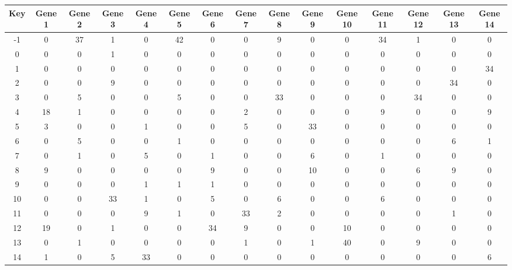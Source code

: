 \begin{tabular}{|c|c|c|c|c|c|c|c|c|c|c|c|c|c|c|}
\hline
Key & Gene 1 & Gene 2 & Gene 3 & Gene 4 & Gene 5 & Gene 6 & Gene 7 & Gene 8 & Gene 9 & Gene 10 & Gene 11 & Gene 12 & Gene 13 & Gene 14 \\
\hline
-1 & 0 & 37 & 1 & 0 & 42 & 0 & 0 & 9 & 0 & 0 & 34 & 1 & 0 & 0 \\
0 & 0 & 0 & 1 & 0 & 0 & 0 & 0 & 0 & 0 & 0 & 0 & 0 & 0 & 0 \\
1 & 0 & 0 & 0 & 0 & 0 & 0 & 0 & 0 & 0 & 0 & 0 & 0 & 0 & 34 \\
2 & 0 & 0 & 9 & 0 & 0 & 0 & 0 & 0 & 0 & 0 & 0 & 0 & 34 & 0 \\
3 & 0 & 5 & 0 & 0 & 5 & 0 & 0 & 33 & 0 & 0 & 0 & 34 & 0 & 0 \\
4 & 18 & 1 & 0 & 0 & 0 & 0 & 2 & 0 & 0 & 0 & 9 & 0 & 0 & 9 \\
5 & 3 & 0 & 0 & 1 & 0 & 0 & 5 & 0 & 33 & 0 & 0 & 0 & 0 & 0 \\
6 & 0 & 5 & 0 & 0 & 1 & 0 & 0 & 0 & 0 & 0 & 0 & 0 & 6 & 1 \\
7 & 0 & 1 & 0 & 5 & 0 & 1 & 0 & 0 & 6 & 0 & 1 & 0 & 0 & 0 \\
8 & 9 & 0 & 0 & 0 & 0 & 9 & 0 & 0 & 10 & 0 & 0 & 6 & 9 & 0 \\
9 & 0 & 0 & 0 & 1 & 1 & 1 & 0 & 0 & 0 & 0 & 0 & 0 & 0 & 0 \\
10 & 0 & 0 & 33 & 1 & 0 & 5 & 0 & 6 & 0 & 0 & 6 & 0 & 0 & 0 \\
11 & 0 & 0 & 0 & 9 & 1 & 0 & 33 & 2 & 0 & 0 & 0 & 0 & 1 & 0 \\
12 & 19 & 0 & 1 & 0 & 0 & 34 & 9 & 0 & 0 & 10 & 0 & 0 & 0 & 0 \\
13 & 0 & 1 & 0 & 0 & 0 & 0 & 1 & 0 & 1 & 40 & 0 & 9 & 0 & 0 \\
14 & 1 & 0 & 5 & 33 & 0 & 0 & 0 & 0 & 0 & 0 & 0 & 0 & 0 & 6 \\
\hline
\end{tabular}